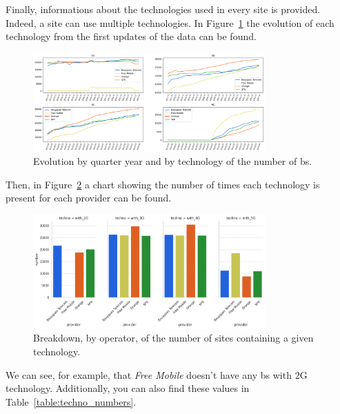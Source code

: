 \documentclass[lettersize,journal,english]{IEEEtran}
\begin{document}
        Finally, informations about the technologies used in every site is provided. Indeed, a site can use multiple technologies.
        In Figure~\ref{fig:data_evolution} the evolution of each technology from the first updates of the data can be found.
        \begin{figure}
            \centering
            \includegraphics[width=3.5in]{images/data_analysis/technos-evolution.png}
            \caption{Evolution by quarter year and by technology of the number of \acrshort{bs}.}
            \label{fig:data_evolution}
        \end{figure}
        Then, in Figure~\ref{fig:data_technos} a chart showing the number of times each technology is present for each provider can be found.
        \begin{figure}
            \centering
            \includegraphics[width=3.5in]{images/data_analysis/with_techno.png}
            \caption{Breakdown, by operator, of the number of sites containing a given technology.}
            \label{fig:data_technos}
        \end{figure}
        We can see, for example, that \emph{Free Mobile} doesn't have any \acrshort{bs} with $2$G technology. Additionally, you can also find these values in Table~\ref{table:techno_numbers}.
\end{document}
